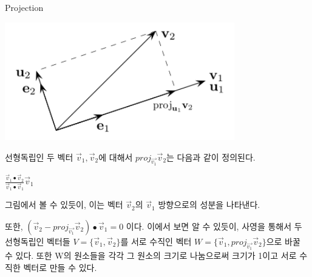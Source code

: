 \documentclass{beamer}
\begin{document}
\begin{frame}[allowframebreaks]{Projection} 

\includegraphics[width=10cm,keepaspectratio]{proj}

선형독립인 두 벡터 $\vec{v}_1, \vec{v}_2$에 대해서 $proj_{\vec{v_1}}\vec{v}_2$는 다음과 같이 정의된다. 

$\frac{\vec{v}_1 \bullet \vec{v}_2 }{\vec{v}_1 \bullet \vec{v}_1} \vec{v}_1$ 

그림에서 볼 수 있듯이, 이는 벡터 $\vec{v}_2$의 $\vec{v}_1$ 방향으로의 성분을 나타낸다. 

\framebreak
또한, $( \vec{v}_2 - proj_{\vec{v_1}}\vec{v}_2 ) \bullet \vec{v}_1 = 0$ 이다. 
\vspace{5mm}
이에서 보면 알 수 있듯이, 사영을 통해서 두 선형독립인 벡터들 $V = \{ \vec{v}_1, \vec{v}_2\}$를 서로 수직인 벡터 $W = \{ \vec{v}_1, proj_{\vec{v_1}}\vec{v}_2\}$으로 바꿀 수 있다. 또한 W의 원소들을 각각 그 원소의 크기로 나눔으로써 크기가 1이고 서로 수직한 벡터로 만들 수 있다. 
\end{frame} 
\end{document}
